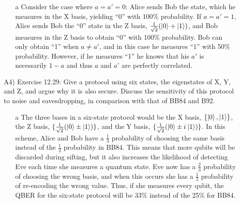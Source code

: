 \documentclass[conference]{IEEEtran}
\begin{document}
\begin{itemize}
  \begin{itemize}
  \item [a] Consider the case where $a=a'=0$: Alice sends Bob the  state, which he measures in the X basis, yielding ``0'' with 100\% probability. If $a=a'=1$, Alice sends Bob the ``0'' state in the Z basis, $\frac{1}{\sqrt{2}}(\left\vert{0}\right\rangle+\left\vert{1}\right\rangle)$, and Bob measures in the Z basis to obtain ``0'' with 100\% probability. Bob can only obtain ``1'' when $a\neq a'$, and in this case he measures ``1'' with 50\% probability. However, if he measures ``1'' he knows that his $a'$ is necessarily $1-a$ and thus $a$ and $a'$ are perfectly correlated.
  \end{itemize}
\item [A4)] Exercise 12.29: Give a protocol using six states, the eigenstates of X, Y, and Z, and argue why it is also secure. Discuss the sensitivity of this protocol to noise and eavesdropping, in comparison with that of BB84 and B92.
  \begin{itemize}
  \item [a] The three bases in a six-state protocol would be the X basis, $\{\left\vert{0}\right\rangle,\left\vert{1}\right\rangle\}$, the Z basis, $\{\frac{1}{\sqrt{2}}(\left\vert{0}\right\rangle\pm\left\vert{1}\right\rangle)\}$, and the Y basis, $\{\frac{1}{\sqrt{2}}(\left\vert{0}\right\rangle\pm{i\mkern1mu}\left\vert{1}\right\rangle)\}$. In this scheme, Alice and Bob have a $\frac{1}{3}$ probability of choosing the same basis instead of the $\frac{1}{2}$ probability in BB84. This means that more qubits will be discarded during sifting, but it also increases the likelihood of detecting Eve each time she measures a quantum state. Eve now has a $\frac{2}{3}$ probability of choosing the wrong basis, and when this occurs she has a $\frac{1}{2}$ probability of re-encoding the wrong value. Thus, if she measures every qubit, the QBER for the six-state protocol will be 33\% instead of the 25\% for BB84.
  \end{itemize}
\end{itemize}

\end{document}
